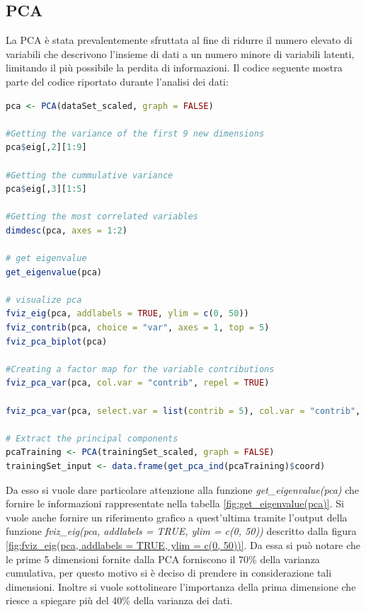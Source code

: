 \documentclass[letterpaper,11pt]{article}
\begin{document}
\subsection{PCA}
La PCA è stata prevalentemente sfruttata al fine di ridurre il numero elevato di variabili che descrivono l'insieme di dati a un numero minore di variabili latenti, limitando il più possibile la perdita di informazioni. Il codice seguente mostra parte del codice riportato durante l'analisi dei dati:
\begin{lstlisting}[language=R]
pca <- PCA(dataSet_scaled, graph = FALSE)

#Getting the variance of the first 9 new dimensions
pca$eig[,2][1:9]

#Getting the cummulative variance
pca$eig[,3][1:5]

#Getting the most correlated variables
dimdesc(pca, axes = 1:2)

# get eigenvalue
get_eigenvalue(pca)

# visualize pca
fviz_eig(pca, addlabels = TRUE, ylim = c(0, 50))
fviz_contrib(pca, choice = "var", axes = 1, top = 5)
fviz_pca_biplot(pca)

#Creating a factor map for the variable contributions
fviz_pca_var(pca, col.var = "contrib", repel = TRUE)

fviz_pca_var(pca, select.var = list(contrib = 5), col.var = "contrib", repel = TRUE)

# Extract the principal components
pcaTraining <- PCA(trainingSet_scaled, graph = FALSE)
trainingSet_input <- data.frame(get_pca_ind(pcaTraining)$coord)
\end{lstlisting}
Da esso si vuole dare particolare attenzione alla funzione \textit{get\_eigenvalue(pca)} che fornire le informazioni rappresentate nella tabella \ref{fig:get_eigenvalue(pca)}. Si vuole anche fornire un riferimento grafico a quest'ultima tramite l'output della funzione \textit{fviz\_eig(pca, addlabels = TRUE, ylim = c(0, 50))} descritto dalla figura \ref{fig:fviz_eig(pca, addlabels = TRUE, ylim = c(0, 50))}. Da essa si può notare che le prime 5 dimensioni fornite dalla PCA forniscono il 70\% della varianza cumulativa, per questo motivo si è deciso di prendere in considerazione tali dimensioni. Inoltre si vuole sottolineare l'importanza della prima dimensione che riesce a spiegare più del 40\% della varianza dei dati.
\end{document}
